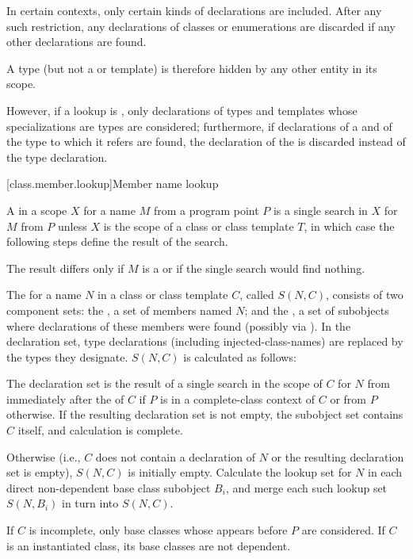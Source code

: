 \pnum
In certain contexts, only certain kinds of declarations are included.
After any such restriction, any declarations of classes or enumerations are discarded if any other declarations are found.
\begin{note}
A type (but not a  or template)
is therefore hidden by any other entity in its scope.
\end{note}
%
However, if a lookup is ,
only declarations of
types and templates whose specializations are types are considered;
furthermore, if declarations
of a  and of the type to which it refers are found,
the declaration of the  is discarded
instead of the type declaration.

[class.member.lookup]{Member name lookup}%
%
%

\pnum
{}%
A  in a scope $X$ for a name $M$ from a program point $P$
is a single search in $X$ for $M$ from $P$
unless $X$ is the scope of a class or class template $T$, in which case the
following steps define the result of the search.
\begin{note}
The result differs only
if $M$ is a  or
if the single search would find nothing.
\end{note}

\pnum
The  for a name $N$ in a class or class template $C$, called $S(N,C)$,
consists of two component sets:
the , a set of members named $N$; and
the ,
a set of subobjects where declarations of these members were found
(possibly via ).
In the declaration set, type declarations (including injected-class-names)
are replaced by the types they designate. $S(N,C)$ is calculated as follows:

\pnum
The declaration set is the result of
a single search in the scope of $C$ for $N$
from immediately after the  of $C$
if $P$ is in a complete-class context of $C$ or
from $P$ otherwise.
If the resulting declaration set is not empty, the subobject set
contains $C$ itself, and calculation is complete.

\pnum
Otherwise (i.e., $C$ does not contain a declaration of $N$
or the resulting declaration set is empty), $S(N,C)$ is initially empty.
Calculate the lookup set for $N$
in each direct non-dependent base class subobject $B_i$, and
merge each such lookup set $S(N,B_i)$ in turn into $S(N,C)$.
\begin{note}
If $C$ is incomplete,
only base classes whose  appears before $P$
are considered.
If $C$ is an instantiated class, its base classes are not dependent.
\end{note}


